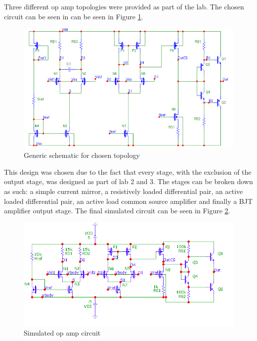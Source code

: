 



Three different op amp topologies were provided as part of the lab. The chosen circuit can be seen in can be seen in Figure \ref{fig:default}.

\begin{figure}[H]
    \begin{center}
    \includegraphics[scale=.45]{Simulations/default_circ.png}
    \caption{Generic schematic for chosen topology \cite{b2}}
    \label{fig:default}
    \end{center}
\end{figure}
This design was chosen due to the fact that every stage, with the exclusion of the output stage, was designed as part of lab 2 and 3. The stages can be broken down as such: a simple current mirror, a resistively loaded differential pair, an active loaded differential pair, an active load common source amplifier and finally a BJT amplifier output stage. The final simulated circuit can be seen in Figure \ref{fig:simcircuit}.

\begin{figure}[H]
    \begin{center}
    \includegraphics[scale=.55]{Simulations/simcircuit.png}
    \caption{Simulated op amp circuit}
    \label{fig:simcircuit}
    \end{center}
\end{figure}

